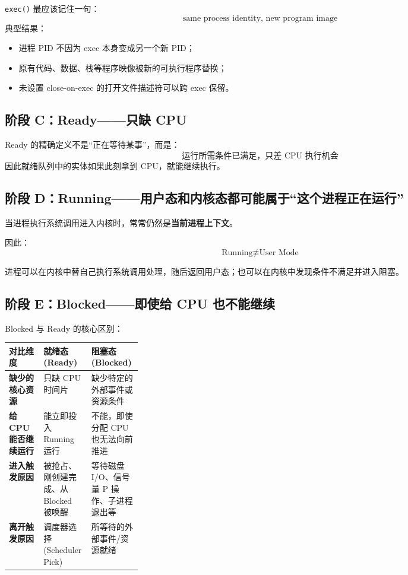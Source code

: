 \documentclass[11pt,a4paper]{ctexart}
\newcommand{\kw}[1]{\textbf{#1}}
\newcommand{\code}[1]{\texttt{#1}}
\begin{document}
\code{exec()} 最应该记住一句：
\[
\boxed{\text{same process identity, new program image}}
\]
典型结果：
\begin{itemize}
\item 进程 PID 不因为 exec 本身变成另一个新 PID；
\item 原有代码、数据、栈等程序映像被新的可执行程序替换；
\item 未设置 close-on-exec 的打开文件描述符可以跨 exec 保留。
\end{itemize}

\subsection{阶段 C：Ready——只缺 CPU}

Ready 的精确定义不是“正在等待某事”，而是：
\[
\boxed{\text{运行所需条件已满足，只差 CPU 执行机会}}
\]
因此就绪队列中的实体如果此刻拿到 CPU，就能继续执行。

\subsection{阶段 D：Running——用户态和内核态都可能属于“这个进程正在运行”}

当进程执行系统调用进入内核时，常常仍然是\kw{当前进程上下文}。

因此：
\[
\text{Running}\not\equiv\text{User Mode}
\]

进程可以在内核中替自己执行系统调用处理，随后返回用户态；也可以在内核中发现条件不满足并进入阻塞。

\subsection{阶段 E：Blocked——即使给 CPU 也不能继续}

Blocked 与 Ready 的核心区别：

\begingroup
\small
\renewcommand{\arraystretch}{1.25}
\setlength{\tabcolsep}{6pt}
\begin{tabularx}{\linewidth}{>{\bfseries}p{0.26\linewidth} X X}
\toprule
对比维度 & 就绪态 (Ready) & 阻塞态 (Blocked)\\
\midrule
缺少的核心资源 & 只缺 CPU 时间片 & 缺少特定的外部事件或资源条件\\
给 CPU 能否继续运行 & 能立即投入 Running 运行 & 不能，即使分配 CPU 也无法向前推进\\
进入触发原因 & 被抢占、刚创建完成、从 Blocked 被唤醒 & 等待磁盘 I/O、信号量 P 操作、子进程退出等\\
离开触发原因 & 调度器选择 (Scheduler Pick) & 所等待的外部事件/资源就绪\\
\bottomrule
\end{tabularx}
\endgroup
\end{document}
